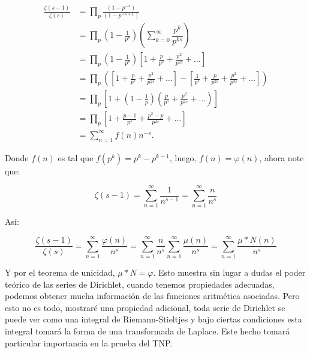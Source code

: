$$\begin{aligned}
\frac{\zeta(s-1)}{\zeta(s)} & =\prod_{p} \frac{\left(1-p^{-s}\right)}{\left(1-p^{-s+1}\right)} \\
&=\prod_{p}\left(1-\frac{1}{p^s}\right)\left(\sum_{k=0}^{\infty}\dfrac{p^k}{p^{ks}}\right)\\
& =\prod_{p}\left(1-\frac{1}{p^s}\right)\left[1+\frac{p}{p^s}+\frac{p^2}{p^{2 s}}+\ldots\right] \\
& =\prod_{p}\left(\left[1+\frac{p}{p^s}+\frac{p^2}{p^{2 s}}+\ldots\right]-\left[\frac{1}{p^s}+\frac{p}{p^{2 s}}+\frac{p^2}{p^{3 s}}+\ldots\right]\right) \\
& =\prod_{p }\left[1+\left(1-\frac{1}{p}\right)\left(\frac{p}{p^s}+\frac{p^2}{p^{2 s}}+\ldots\right)\right] \\
&=\prod_{p }\left[1+\frac{p-1}{p^s}+\frac{p^2-p}{p^{2 s}}+\ldots\right]\\
& =\sum_{n=1}^{\infty}f(n)n^{-s}.
\end{aligned}$$

Donde $f(n)$ es tal que $f(p^{k})=p^{k}-p^{k-1}$, luego, $f(n)=\varphi(n)$, ahora note que:

$$\zeta(s-1)=\sum_{n=1}^{\infty} \frac{1}{n^{s-1}}=\sum_{n=1}^{\infty} \frac{n}{n^s}$$

Así:

$$\frac{\zeta(s-1)}{\zeta(s)}=\sum_{n=1}^{\infty} \frac{\varphi(n)}{n^s}=\sum_{n=1}^{\infty} \frac{n}{n^s}\sum_{n=1}^{\infty} \frac{\mu(n)}{n^s}=\sum_{n=1}^{\infty} \frac{\mu*N(n)}{n^s}$$

Y por el teorema de unicidad, $\mu*N=\varphi$. Esto muestra sin lugar a dudas el poder teórico de las series de Dirichlet, cuando tenemos propiedades adecuadas, podemos obtener mucha información de las funciones aritmética asociadas. Pero esto no es todo, mostraré una propiedad adicional, toda serie de Dirichlet se puede ver como una integral de Riemann-Stieltjes y bajo ciertas condiciones esta integral tomará la forma de una transformada de Laplace. Este hecho tomará particular importancia en la prueba del TNP.